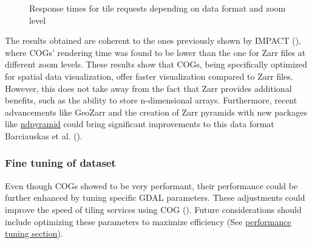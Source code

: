 \documentclass[
  oneside,
  open=any]{scrbook}
\begin{document}
\begin{figure}[H]


\caption{\label{fig-format-comp}Response times for tile requests
depending on data format and zoom level}

\end{figure}%

The results obtained are coherent to the ones previously shown by IMPACT
(), where COGs' rendering time
was found to be lower than the one for Zarr files at different zoom
levels. These results show that COGs, being specifically optimized for
spatial data visualization, offer faster visualization compared to Zarr
files. However, this does not take away from the fact that Zarr provides
additional benefits, such as the ability to store n-dimensional arrays.
Furthermore, recent advancements like GeoZarr and the creation of Zarr
pyramids with new packages like
\href{https://github.com/carbonplan/ndpyramid}{ndpyramid} could bring
significant improvements to this data format Barciauskas et al.
().

\subsubsection*{Fine tuning of dataset}\label{fine-tuning-of-dataset}

Even though COGs showed to be very performant, their performance could
be further enhanced by tuning specific GDAL parameters. These
adjustments could improve the speed of tiling services using COG
(). Future
considerations should include optimizing these parameters to maximize
efficiency (See
\href{https://developmentseed.org/titiler/advanced/performance_tuning/}{performance
tuning section}).
\end{document}
